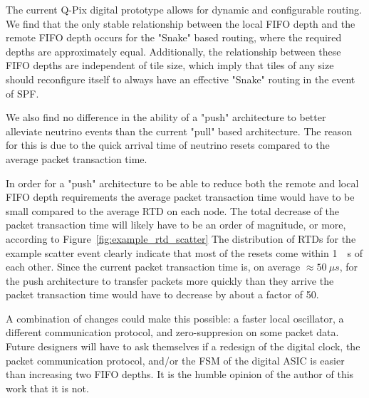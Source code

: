 The current Q-Pix digital prototype allows for dynamic and configurable routing. 
We find that the only stable relationship between the local FIFO depth and the remote FIFO depth occurs for the "Snake" based routing, where the required depths are approximately equal.
Additionally, the relationship between these FIFO depths are independent of tile size, which imply that tiles of any size should reconfigure itself to always have an effective "Snake" routing in the event of SPF.

We also find no difference in the ability of a "push" architecture to better alleviate neutrino events than the current "pull" based architecture.
The reason for this is due to the quick arrival time of neutrino resets compared to the average packet transaction time.

In order for a "push" architecture to be able to reduce both the remote and local FIFO depth requirements the average packet transaction time would have to be small compared to the average RTD on each node. 
The total decrease of the packet transaction time will likely have to be an order of magnitude, or more, according to Figure~\ref{fig:example_rtd_scatter}
The distribution of RTDs for the example scatter event clearly indicate that most of the resets come within 1~\unit{\mu s} of each other.
Since the current packet transaction time is, on average $\approx 50~\unit{\mu s}$, for the push architecture to transfer packets more quickly than they arrive the packet transaction time would have to decrease by about a factor of 50.

A combination of changes could make this possible: a faster local oscillator, a different communication protocol, and zero-suppresion on some packet data.
Future designers will have to ask themselves if a redesign of the digital clock, the packet communication protocol, and/or the FSM of the digital ASIC is easier than increasing two FIFO depths.
It is the humble opinion of the author of this work that it is not.

